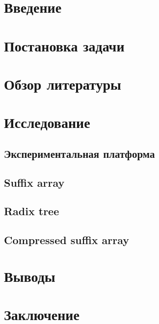 \newpage
\tableofcontents
\newpage

\section{Введение}


\newpage
\section{Постановка задачи}


\newpage
\section{Обзор литературы}


\newpage
\section{Исследование}


\subsection{Экспериментальная платформа}


\subsection{Suffix array}


\subsection{Radix tree}


\subsection{Compressed suffix array}


\section{Выводы}


\section{Заключение}
